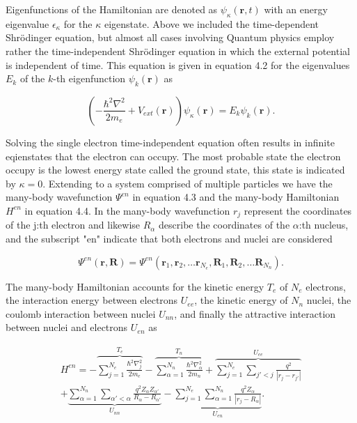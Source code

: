 Eigenfunctions of the Hamiltonian are denoted as $\psi_{\kappa}(\boldsymbol{r}, t)$ with an energy eigenvalue $\epsilon_{\kappa}$ for the $\kappa$ eigenstate. Above we included the time-dependent Shr\"{o}dinger equation, but almost all cases involving Quantum physics employ rather the time-independent Shr\"{o}dinger equation in which the external potential is independent of time. This equation is given in equation 4.2 for the eigenvalues $E_k$ of the $k$-th eigenfunction $\psi_k(\boldsymbol{r})$ as

\begin{equation}
	\left(-\frac{\hbar^2\nabla^2}{2m_e} + V_{ext}(\boldsymbol{r}) \right)\psi_{\kappa}(\boldsymbol{r}) = E_k \psi_k(\boldsymbol{r}).
\end{equation}

Solving the single electron time-independent equation often results in infinite eqienstates that the electron can occupy. The most probable state the electron occupy is the lowest energy state called the ground state, this state is indicated by $\kappa = 0$. Extending to a system comprised of multiple particles we have the many-body wavefunction $\Psi^{en}$ in equation 4.3 and the many-body Hamiltonian $H^{en}$ in equation 4.4. In the many-body wavefunction $r_j$ represent the coordinates of the j:th electron and likewise $R_{\alpha}$ describe the coordinates of the $\alpha$:th nucleus, and the subscript "en" indicate that both electrons and nuclei are considered

\begin{equation}
\Psi^{en}(\boldsymbol{r}, \boldsymbol{R}) = \Psi^{en}(\boldsymbol{r}_1 , \boldsymbol{r}_2, \dots \boldsymbol{r}_{N_e}, \boldsymbol{R}_1, \boldsymbol{R}_2, \dots \boldsymbol{R}_{N_n}).
\end{equation}

The many-body Hamiltonian accounts for the kinetic energy $T_e$ of $N_e$ electrons, the interaction energy between electrons $U_{ee}$, the kinetic energy of $N_n$ nuclei, the coulomb interaction between nuclei $U_{nn}$, and finally the attractive interaction between nuclei and electrons $U_{en}$ as

\begin{equation}
    \begin{split}
       H^{en} = -\overbrace{\sum_{j=1}^{N_e}\frac{\hbar^2\nabla_j ^2}{2m_e}}^{T_e} - \overbrace{\sum_{\alpha=1}^{N_n}\frac{\hbar^2 \nabla_\alpha ^2}{2m_n}}^{T_n} + \overbrace{\sum_{j=1}^{N_e}\sum_{j'<j}\frac{q^2}{|r_j - r_{j'}|}}^{U_{ee}} \\
    + \underbrace{\sum_{\alpha=1}^{N_n}\sum_{\alpha' < \alpha}\frac{q^2Z_\alpha Z_{\alpha'}}{R_\alpha - R_{\alpha'}}}_{U_{nn}} -\underbrace{\sum_{j=1}^{N_e}\sum_{\alpha=1}^{N_n}\frac{q^2Z_\alpha}{|r_j - R_\alpha|}}_{U_{en}}.
    \end{split}
\end{equation} 
 
